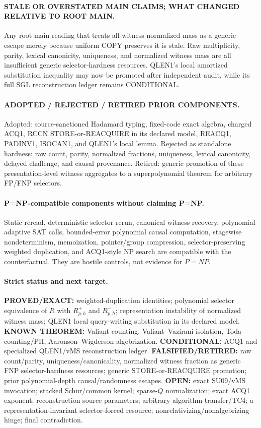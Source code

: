 \documentclass[11pt]{article}
\begin{document}
\paragraph{STALE OR OVERSTATED MAIN CLAIMS; WHAT CHANGED RELATIVE TO ROOT MAIN.}
Any root-main reading that treats all-witness normalized mass as a generic escape merely because uniform COPY preserves it is stale. Raw multiplicity, parity, lexical canonicity, uniqueness, and normalized witness mass are all insufficient generic selector-hardness resources. QLEN1's local amortized substitution inequality may now be promoted after independent audit, while its full SGL reconstruction ledger remains CONDITIONAL.

\paragraph{ADOPTED / REJECTED / RETIRED PRIOR COMPONENTS.}
Adopted: source-sanctioned Hadamard typing, fixed-code exact algebra, charged ACQ1, RCCN STORE-or-REACQUIRE in its declared model, REACQ1, PADINV1, ISOCAN1, and QLEN1's local lemma. Rejected as standalone hardness: raw count, parity, normalized fractions, uniqueness, lexical canonicity, delayed challenge, and causal provenance. Retired: generic promotion of these presentation-level witness aggregates to a superpolynomial theorem for arbitrary FP/FNP selectors.

\paragraph{P=NP-compatible components without claiming P=NP.}
Static reread, deterministic selector rerun, canonical witness recovery, polynomial adaptive SAT calls, bounded-error polynomial causal computation, stagewise nondeterminism, memoization, pointer/group compression, selector-preserving weighted duplication, and ACQ1-style NP search are compatible with the counterfactual. They are hostile controls, not evidence for $P=NP$.

\paragraph{Strict status and next target.}
\textbf{PROVED/EXACT:} weighted-duplication identities; polynomial selector equivalence of $R$ with $R^+_{p,h}$ and $R^-_{p,h}$; representation instability of normalized witness mass; QLEN1 local query-writing substitution in its declared model.
\textbf{KNOWN THEOREM:} Valiant counting, Valiant--Vazirani isolation, Toda counting/PH, Aaronson--Wigderson algebrization.
\textbf{CONDITIONAL:} ACQ1 and specialized QLEN1/vMS reconstruction ledger.
\textbf{FALSIFIED/RETIRED:} raw count/parity, uniqueness/canonicality, normalized witness fraction as generic FNP selector-hardness resources; generic STORE-or-REACQUIRE promotion; prior polynomial-depth causal/randomness escapes.
\textbf{OPEN:} exact SU09/vMS invocation; stacked Schur/common kernel; sparse-$Q$ normalization; exact ACQ1 exponent; reconstruction source parameters; arbitrary-algorithm transfer/TC4; a representation-invariant selector-forced resource; nonrelativizing/nonalgebrizing hinge; final contradiction.
\end{document}
